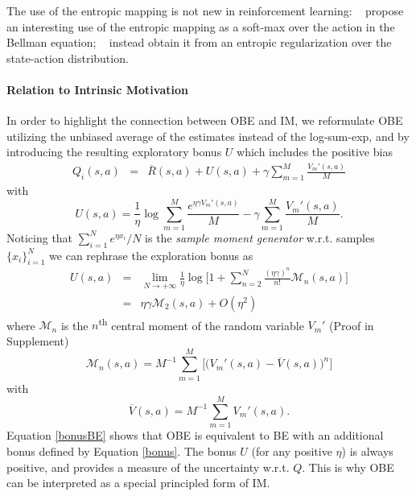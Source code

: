 The use of the entropic mapping is not new in reinforcement learning: \citeauthor{asadi2017alternative}~ propose an interesting use of the entropic mapping as a soft-max over the action in the Bellman equation; \citeauthor{peters2010relative}~ instead obtain it from an entropic regularization over the state-action distribution.

\paragraph{Relation to Intrinsic Motivation}
In order to highlight the connection between OBE and IM, we reformulate OBE utilizing the unbiased average of the estimates instead of the log-sum-exp,
and by introducing the resulting exploratory bonus $U$ which includes the positive bias
\begin{eqnarray}
Q_i(s,a)\! &=&\! \overline{R}(s,a) + U(s,a) +  \gamma  \sum_{m=1}^M \frac{V_m'(s,a)}{M} \label{bonusBE}
\end{eqnarray}
with
\begin{equation}
U(s,a) \! =\!  \frac{1}{\eta}\log\sum_{m=1}^M \frac{e^{\eta\gamma V_m'(s,a)}}{M} - \gamma  \sum_{m=1}^M \frac{V_m'(s,a)}{M}. \label{bonusdef}
\end{equation}
Noticing that $\sum_{i=1}^N e^{\eta x_i}/N$ is the \textsl{sample moment generator} w.r.t. samples $\{x_i\}_{i=1}^N$ we can rephrase the exploration bonus as
\begin{eqnarray}
U(s,a)& = & \lim_{N \to +\infty}\frac{1}{\eta} \log \Biggl[  1 + \sum_{n=2}^{N} \frac{(\eta\gamma)^n}{n!}\mathcal{M}_n(s,a)\Biggr] \nonumber \\
& = & \eta \gamma \mathcal{M}_2(s,a)  + O(\eta^2)\label{bonus}
\end{eqnarray}
where $\mathcal{M}_n$ is the $n$\textsuperscript{th} central moment of the random variable $V_m'$ (Proof in Supplement)
\begin{equation}
\mathcal{M}_n(s,a) = M^{-1} \sum_{m=1}^M \Biggl[ \Big( V_m'(s,a) -\overline{V}(s,a) \Big)^n \Biggr]\nonumber
\end{equation}
with 
\begin{equation}
\overline{V}(s,a) = M^{-1} \sum_{m=1}^M V_m'(s,a).\nonumber
\end{equation}
Equation \eqref{bonusBE} shows that OBE is equivalent to BE with an additional bonus defined by Equation \eqref{bonus}. The bonus $U$ (for any positive $\eta$) is always positive, and provides a measure of the uncertainty w.r.t. $Q$. This is why OBE can be interpreted as a special principled form of IM.

